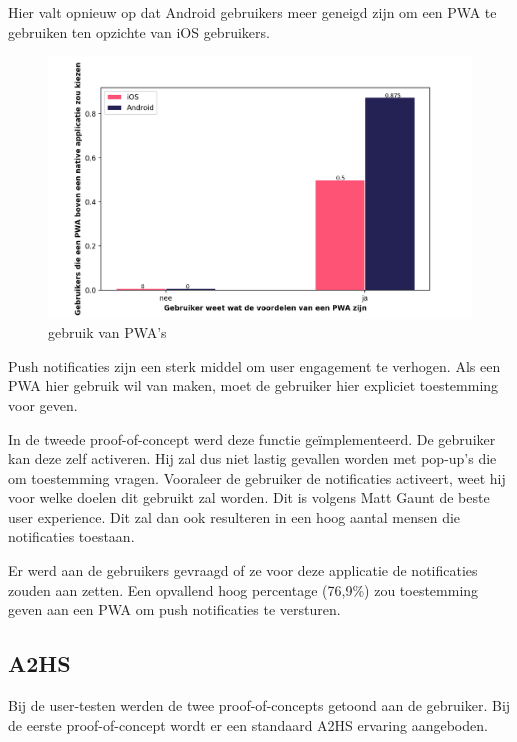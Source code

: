 		Hier valt opnieuw op dat Android gebruikers meer geneigd zijn om een PWA te gebruiken ten opzichte van iOS gebruikers.
		
		\begin{figure}[H]
			\centering
			\includegraphics[width=120mm]{./img/PWA_over_Native.png}
			\caption{gebruik van PWA's}
		\end{figure}

		
		Push notificaties zijn een sterk middel om user engagement te verhogen. \autocite{Gaunt2020} Als een PWA hier gebruik wil van maken, moet de gebruiker hier expliciet toestemming voor geven. 
		
		In de tweede proof-of-concept werd deze functie geïmplementeerd. De gebruiker kan deze zelf activeren. Hij zal dus niet lastig gevallen worden met pop-up's die om toestemming vragen. Vooraleer de gebruiker de notificaties activeert, weet hij voor welke doelen dit gebruikt zal worden. Dit is volgens Matt Gaunt de beste user experience. Dit zal dan ook resulteren in een hoog aantal mensen die notificaties toestaan. \autocite{Gaunt2019c}
		
		Er werd aan de gebruikers gevraagd of ze voor deze applicatie de notificaties zouden aan zetten. Een opvallend hoog percentage (76,9\%) zou toestemming geven aan een PWA om push notificaties te versturen.
		
		
		
	\subsection{A2HS}
		Bij de user-testen werden de twee proof-of-concepts getoond aan de gebruiker. Bij de eerste proof-of-concept wordt er een standaard A2HS ervaring aangeboden.
		
